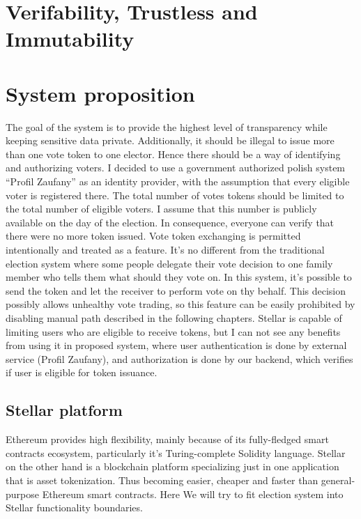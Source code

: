 \documentclass[runningheads]{llncs}
\begin{document}
\section{Verifability, Trustless and Immutability}


\section{System proposition}

The goal of the system is to provide the highest level of transparency while keeping sensitive data private. Additionally, it should be illegal to issue more than one vote token to one elector. Hence there should be a way of identifying and authorizing voters. I decided to use a government authorized polish system
“Profil Zaufany” as an identity provider, with the assumption that every eligible voter is registered there. The total number of votes tokens should be limited to the total number of eligible voters. I assume that this number is publicly available on the day of the election. In consequence, everyone can verify that there were no more token issued. Vote token exchanging is permitted intentionally and treated as a feature. It’s no different from the traditional election system where some people delegate their vote decision to one family member who tells them what should they vote on. In this system, it’s possible to send the token and let the receiver to perform vote on thy behalf. This decision possibly allows unhealthy vote trading, so this feature can be easily prohibited by disabling manual path described in the following chapters. Stellar is capable of limiting users who are eligible to receive tokens, but I can not see any benefits from using it in proposed system, where user authentication is done by external service (Profil Zaufany), and authorization is done by our backend, which verifies if user is eligible for token issuance.

\subsection{Stellar platform}
Ethereum provides high flexibility, mainly because of its fully-fledged smart contracts ecosystem, particularly it’s Turing-complete Solidity language. Stellar on the other hand is a blockchain platform specializing just in one application that is asset tokenization. Thus becoming easier, cheaper and faster than general-purpose Ethereum smart contracts. Here We will try to fit election system into Stellar functionality boundaries.
\end{document}
